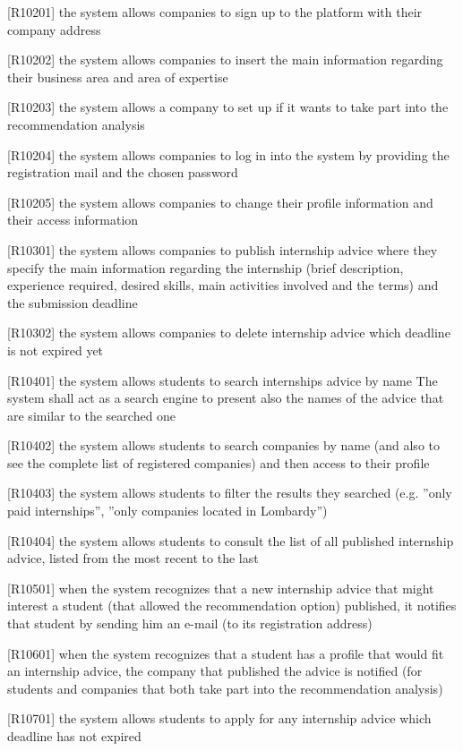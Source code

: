 		[R10201] the system allows companies to sign up to the platform with their company address
		
		[R10202] the system allows companies to insert the main information regarding their business area and area of expertise
		
		[R10203] the system allows a company to set up if it wants to take part into the recommendation analysis
		
		[R10204] the system allows companies to log in into the system by providing the registration mail and the chosen password
		
		[R10205] the system allows companies to change their profile information and their access information
		
		[R10301] the system allows companies to publish internship advice where they specify the main information regarding the internship (brief description, experience required, desired skills, main activities involved and the terms) and the submission deadline
		
		[R10302] the system allows companies to delete internship advice which deadline is not expired yet
		
		[R10401] the system allows students to search internships advice by name The system shall act as a search engine to present also the names of the advice that are similar to the searched one
		
		[R10402] the system allows students to search companies by name (and also to see the complete list of registered companies) and then access to their profile
		
		[R10403] the system allows students to filter the results they searched (e.g. ”only paid internships”, ”only companies located in Lombardy”)
		
		[R10404] the system allows students to consult the list of all published internship advice, listed from the most recent to the last
		
		[R10501] when the system recognizes that a new internship advice that might interest a student (that allowed the recommendation option) published, it notifies that student by sending him an e-mail (to its registration address)
		
		[R10601] when the system recognizes that a student has a profile that would fit an internship advice, the company that published the advice is notified (for students and companies that both take part into the recommendation analysis)
		
		[R10701] the system allows students to apply for any internship advice which deadline has not expired
		
